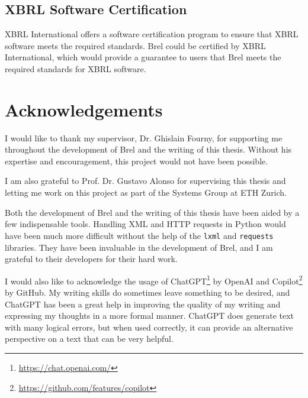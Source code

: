 \subsection{XBRL Software Certification}

XBRL International offers a software certification program to ensure that XBRL software meets the required standards\cite{xbrl_certified_software}.
Brel could be certified by XBRL International, which would provide a guarantee to users that Brel meets the required standards for XBRL software.


\pagebreak
\section{Acknowledgements}

I would like to thank my supervisor, Dr. Ghislain Fourny, 
for supporting me throughout the development of Brel and the writing of this thesis.
Without his expertise and encouragement, this project would not have been possible.

I am also grateful to Prof. Dr. Gustavo Alonso for supervising this thesis and letting me work on this project
as part of the Systems Group at ETH Zurich.

Both the development of Brel and the writing of this thesis have been aided by a few indispensable tools.
Handling XML and HTTP requests in Python would have been much more difficult without the help of the \texttt{lxml} and \texttt{requests} libraries.
They have been invaluable in the development of Brel, and I am grateful to their developers for their hard work.

I would also like to acknowledge the usage of ChatGPT\footnote{\url{https://chat.openai.com/}} by OpenAI 
and Copilot\footnote{\url{https://github.com/features/copilot}} by GitHub.
My writing skills do sometimes leave something to be desired, and ChatGPT has been a great help in improving the quality of my writing and expressing my thoughts in a more formal manner.
ChatGPT does generate text with many logical errors, but when used correctly, it can provide an alternative perspective on a text that can be very helpful. 

